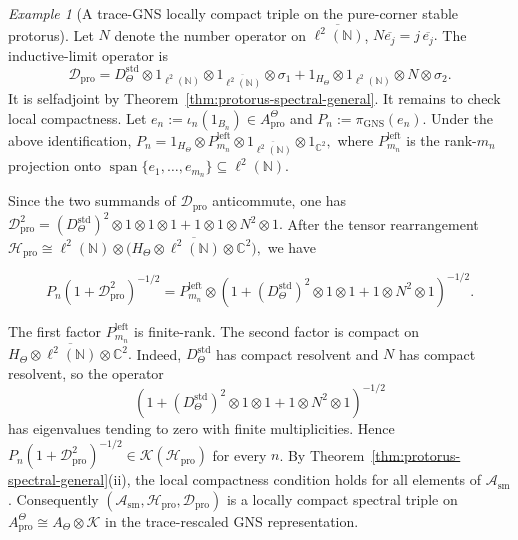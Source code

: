\documentclass[11pt]{amsart}
\theoremstyle{definition}
\theoremstyle{remark}
\newtheorem{example}[theorem]{Example}
\newcommand{\C}{\mathbb C}
\newcommand{\N}{\mathbb N}
\newcommand{\K}{\ensuremath{\mathcal{K}}}
\newcommand{\ex}{\mathrm{pro}}
\begin{document}
\begin{example}[A trace-GNS locally compact triple on the pure-corner stable protorus]
Let $N$ denote the number operator on $\overline{\ell^2(\N)}$, $N\overline{e_j}=j\,\overline{e_j}.$
The inductive-limit operator is
\[
\mathcal D_{\ex}
=
D_\Theta^{\mathrm{std}}
\otimes1_{\ell^2(\N)}
\otimes1_{\overline{\ell^2(\N)}}
\otimes\sigma_1
+
1_{H_\Theta}
\otimes1_{\ell^2(\N)}
\otimes N
\otimes\sigma_2.
\]
It is selfadjoint by Theorem~\ref{thm:protorus-spectral-general}. It remains to check local compactness. Let $e_n:=\iota_n(1_{B_n})\in A_{\ex}^{\Theta}$
and $P_n:=\pi_{\mathrm{GNS}}(e_n).$
Under the above identification, $P_n=1_{H_\Theta}\otimes P_{m_n}^{\mathrm{left}}\otimes1_{\overline{\ell^2(\N)}}\otimes1_{\C^2},$
where $P_{m_n}^{\mathrm{left}}$ is the rank-$m_n$ projection onto
$\operatorname{span}\{e_1,\ldots,e_{m_n}\}\subseteq\ell^2(\N)$.

Since the two summands of $\mathcal D_{\ex}$ anticommute, one has
$\mathcal D_{\ex}^2=(D_\Theta^{\mathrm{std}})^2\otimes1\otimes1\otimes1+1\otimes1\otimes N^2\otimes1.$
After the tensor rearrangement $\mathcal H_{\ex}
\cong
\ell^2(\N)\otimes
\bigl(H_\Theta\otimes\overline{\ell^2(\N)}\otimes\C^2\bigr),$
we have

\[
P_n(1+\mathcal D_{\ex}^2)^{-1/2}
=
P_{m_n}^{\mathrm{left}}
\otimes
\left(
1+
(D_\Theta^{\mathrm{std}})^2\otimes1\otimes1
+
1\otimes N^2\otimes1
\right)^{-1/2}.
\]

The first factor $P_{m_n}^{\mathrm{left}}$ is finite-rank. The second factor is compact on $H_\Theta\otimes\overline{\ell^2(\N)}\otimes\C^2.$
Indeed, $D_\Theta^{\mathrm{std}}$ has compact resolvent and $N$ has compact
resolvent, so the operator \[\left(
1+
(D_\Theta^{\mathrm{std}})^2\otimes1\otimes1
+
1\otimes N^2\otimes1
\right)^{-1/2}\]
has eigenvalues tending to zero with finite multiplicities. Hence $P_n(1+\mathcal D_{\ex}^2)^{-1/2}\in\mathcal K(\mathcal H_{\ex})$
for every $n$. By Theorem~\ref{thm:protorus-spectral-general}\textup{(ii)},
the local compactness condition holds for all elements of
$\mathcal A_{\mathrm{sm}}$. Consequently $(\mathcal A_{\mathrm{sm}},\mathcal H_{\ex},\mathcal D_{\ex})$
is a locally compact spectral triple on $A_{\ex}^{\Theta}\cong A_\Theta\otimes\K$
in the trace-rescaled GNS representation.
\end{example}
\end{document}
